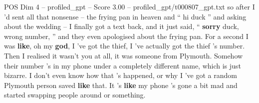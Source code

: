\begin{textsample}{POS Dim 4 – profiled\_gpt – Score 3.00 – profiled\_gpt/t000807\_gpt.txt}  \label{ex:f4_pos_032}
so after I ’d sent all that nonsense – the frying pan in heaven and “ hi duck ” and asking about the wedding – I finally got a text back, and it just said, “ \textbf{sorry} duck, wrong number, ” and they even apologised about the frying pan.
For a second I was \textbf{like}, oh my \textbf{god}, I ’ve got the thief, I ’ve actually got the thief ’s number.
Then I realised it wasn't you at all, it was someone from Plymouth.
Somehow their number ’s in my phone under a completely different name, which is just bizarre.
I don't even know how that ’s happened, or why I ’ve got a random Plymouth person saved \textbf{like} that.
It ’s \textbf{like} my phone ’s gone a bit mad and started swapping people around or something.

\end{textsample}
